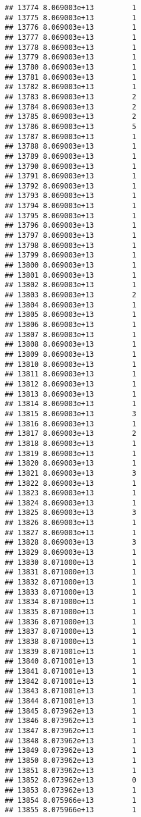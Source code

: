 \documentclass[
]{article}
\begin{document}
\begin{verbatim}
## 13774 8.069003e+13         1
## 13775 8.069003e+13         1
## 13776 8.069003e+13         1
## 13777 8.069003e+13         1
## 13778 8.069003e+13         1
## 13779 8.069003e+13         1
## 13780 8.069003e+13         1
## 13781 8.069003e+13         1
## 13782 8.069003e+13         1
## 13783 8.069003e+13         2
## 13784 8.069003e+13         2
## 13785 8.069003e+13         2
## 13786 8.069003e+13         5
## 13787 8.069003e+13         1
## 13788 8.069003e+13         1
## 13789 8.069003e+13         1
## 13790 8.069003e+13         1
## 13791 8.069003e+13         1
## 13792 8.069003e+13         1
## 13793 8.069003e+13         1
## 13794 8.069003e+13         1
## 13795 8.069003e+13         1
## 13796 8.069003e+13         1
## 13797 8.069003e+13         1
## 13798 8.069003e+13         1
## 13799 8.069003e+13         1
## 13800 8.069003e+13         1
## 13801 8.069003e+13         1
## 13802 8.069003e+13         1
## 13803 8.069003e+13         2
## 13804 8.069003e+13         1
## 13805 8.069003e+13         1
## 13806 8.069003e+13         1
## 13807 8.069003e+13         1
## 13808 8.069003e+13         1
## 13809 8.069003e+13         1
## 13810 8.069003e+13         1
## 13811 8.069003e+13         1
## 13812 8.069003e+13         1
## 13813 8.069003e+13         1
## 13814 8.069003e+13         1
## 13815 8.069003e+13         3
## 13816 8.069003e+13         1
## 13817 8.069003e+13         2
## 13818 8.069003e+13         1
## 13819 8.069003e+13         1
## 13820 8.069003e+13         1
## 13821 8.069003e+13         3
## 13822 8.069003e+13         1
## 13823 8.069003e+13         1
## 13824 8.069003e+13         1
## 13825 8.069003e+13         3
## 13826 8.069003e+13         1
## 13827 8.069003e+13         1
## 13828 8.069003e+13         3
## 13829 8.069003e+13         1
## 13830 8.071000e+13         1
## 13831 8.071000e+13         1
## 13832 8.071000e+13         1
## 13833 8.071000e+13         1
## 13834 8.071000e+13         1
## 13835 8.071000e+13         1
## 13836 8.071000e+13         1
## 13837 8.071000e+13         1
## 13838 8.071000e+13         1
## 13839 8.071001e+13         1
## 13840 8.071001e+13         1
## 13841 8.071001e+13         1
## 13842 8.071001e+13         1
## 13843 8.071001e+13         1
## 13844 8.071001e+13         1
## 13845 8.073962e+13         1
## 13846 8.073962e+13         1
## 13847 8.073962e+13         1
## 13848 8.073962e+13         1
## 13849 8.073962e+13         1
## 13850 8.073962e+13         1
## 13851 8.073962e+13         1
## 13852 8.073962e+13         0
## 13853 8.073962e+13         1
## 13854 8.075966e+13         1
## 13855 8.075966e+13         1

\end{verbatim}
\end{document}
